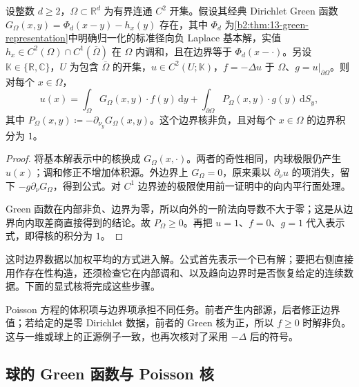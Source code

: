 \begin{theorem}\label{b2:thm:13-dirichlet-representation}
设整数 \(d\geq2\)，\(\Omega\subset\mathbb R^d\) 为有界连通 \(C^2\) 开集。假设其经典 Dirichlet Green 函数 \(G_\Omega(x,y)=\Phi_d(x-y)-h_x(y)\) 存在，其中 \(\Phi_d\) 为\cref{b2:thm:13-green-representation}中明确归一化的标准径向负 Laplace 基本解，实值 \(h_x\in C^2(\Omega)\cap C^1(\overline\Omega)\) 在 \(\Omega\) 内调和，且在边界等于 \(\Phi_d(x-\cdot)\)。另设 \(\mathbb K\in\{\mathbb R,\mathbb C\}\)，\(U\) 为包含 \(\overline\Omega\) 的开集，\(u\in C^2(U;\mathbb K)\)，\(f=-\Delta u\) 于 \(\Omega\)、\(g=u|_{\partial\Omega}\)。则对每个 \(x\in\Omega\)，
\begin{equation}\label{b2:eq:13-dirichlet-representation}
 u(x)=\int_\Omega G_\Omega(x,y)\cdot f(y)\,\mathrm{d}y
      +\int_{\partial\Omega}P_\Omega(x,y)\cdot g(y)\,\mathrm{d}S_y,
\end{equation}
其中 \(P_\Omega(x,y)\coloneqq-\partial_{\nu_y}G_\Omega(x,y)\)。这个边界核非负，且对每个 \(x\in\Omega\) 的边界积分为 \(1\)。
\end{theorem}
\begin{proof}
将基本解表示中的核换成 \(G_\Omega(x,\cdot)\)。两者的奇性相同，内球极限仍产生 \(u(x)\)；调和修正不增加体积源。外边界上 \(G_\Omega=0\)，原来乘以 \(\partial_\nu u\) 的项消失，留下 \(-g\partial_\nu G_\Omega\)，得到公式。对 \(C^1\) 边界迹的极限使用前一证明中的向内平行面处理。

Green 函数在内部非负、边界为零，所以向外的一阶法向导数不大于零；这是从边界向内取差商直接得到的结论。故 \(P_\Omega\geq0\)。再把 \(u=1\)、\(f=0\)、\(g=1\) 代入表示式，即得核的积分为 \(1\)。
\end{proof}

这时边界数据以加权平均的方式进入解。公式首先表示一个已有解；要把右侧直接用作存在性构造，还须检查它在内部调和、以及趋向边界时是否恢复给定的连续数据。下面的显式核将完成这些步骤。

\ProseParagraphBreak

Poisson 方程的体积项与边界项承担不同任务。前者产生内部源，后者修正边界值；若给定的是零 Dirichlet 数据，前者的 Green 核为正，所以 \(f\geq0\) 时解非负。这与一维或球上的正源例子一致，也再次核对了采用 \(-\Delta\) 后的符号。


\subsection{球的 Green 函数与 Poisson 核}
\label{b2:subsec:130403}

